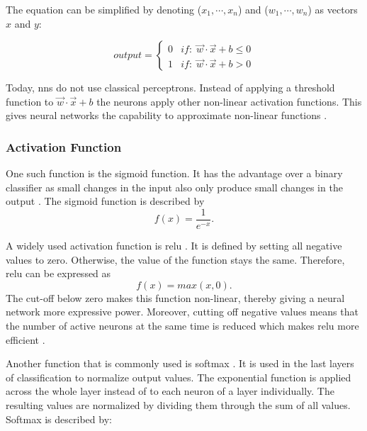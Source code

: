 The equation can be simplified by denoting ($x_1, \cdots, x_n$) and ($w_1, \cdots, w_n$) as vectors $x$ and $y$:

\begin{equation}
    output = 
    \begin{cases}\label{eq:PerceptronVector}
    0 & if:\; \vec{w} \cdot \vec{x} + b \le 0 \\
    1 & if:\; \vec{w} \cdot \vec{x} + b > 0
    \end{cases}
\end{equation}

Today, \acp{nn} do not use classical perceptrons. Instead of applying a threshold function to $\vec{w} \cdot \vec{x} + b$ the neurons apply other non-linear activation functions. This gives neural networks the capability to approximate non-linear functions \cite{cybenko1989approximation, hornik1991approximation, sharma2020activation}.

\subsubsection{Activation Function}
\label{sec:Foundations:NeuralNetworks:ActivationFunction}

One such function is the sigmoid function.  It has the advantage over a binary classifier as small changes in the input also only produce small changes in the output \cite{nielsen2015neural}. The sigmoid function is described by $$f(x) = \frac{1}{e^{-x}}.$$

A widely used activation function is \ac{relu} \cite{fukushima1969visual, goodfellow2016deep, nielsen2015neural}. It is defined by setting all negative values to zero. Otherwise, the value of the function stays the same. Therefore, \ac{relu} can be expressed as $$f(x)  = max(x,0).$$ 
The cut-off below zero makes this function non-linear, thereby giving a neural network more expressive power. Moreover, cutting off negative values means that the number of active neurons at the same time is reduced which makes \ac{relu} more efficient \cite{sharma2020activation}.

Another function that is commonly used is softmax \cite{liu2016computer, goodfellow2016deep}. It is used in the last layers of classification to normalize output values. The exponential function is applied across the whole layer instead of to each neuron of a layer individually. The resulting values are normalized by dividing them through the sum of all values. Softmax is described by:

